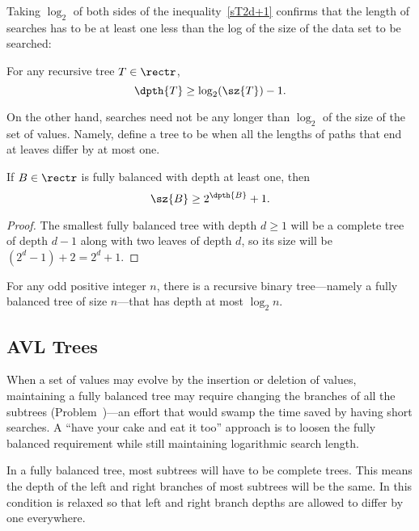 \begin{definition}
Taking $\log_2$ of both sides of the inequality~\eqref{sT2d+1}
confirms that the length of searches has to be at least one less than
the log of the size of the data set to be searched:

\begin{corollary}
For any recursive tree $T \in \rectr$,
\begin{equation}\label{}
\dpth{T} \geq \log_2(\sz{T}) - 1.
\end{equation}
\end{corollary}

On the other hand, searches need not be any longer than $\log_2$ of the
size of the set of values.  Namely, define a tree to be  when all the lengths of paths that end at leaves differ by
at most one.

\begin{theorem}\label{b>2d}
If $B \in \rectr$ is fully balanced with depth at least one, then
\[
\sz{B} \geq 2^{\dpth{B}} + 1.
\]

\begin{proof}
The smallest fully balanced tree with depth $d \geq 1$ will be a complete
tree of depth $d-1$ along with two leaves of depth $d$, so its size
will be $(2^d-1) + 2 = 2^d+1$.
\end{proof}
\end{theorem}

\begin{corollary}
For any odd positive integer $n$, there is a recursive binary
tree---namely a fully balanced tree of size $n$---that has depth at
most $\log_2 n$.
\end{corollary}

\subsection{AVL Trees}

When a set of values may evolve by the insertion or deletion of
values, maintaining a fully balanced tree may require changing the
branches of all the subtrees (Problem~)---an
effort that would swamp the time saved by having short searches.  A
``have your cake and eat it too'' approach is to loosen the fully
balanced requirement while still maintaining logarithmic search
length.

In a fully balanced tree, most subtrees will have to be complete
trees.  This means the depth of the left and right branches of most
subtrees will be the same.  In  this condition is
relaxed so that left and right branch depths are allowed to differ by
one everywhere.


\end{definition}
